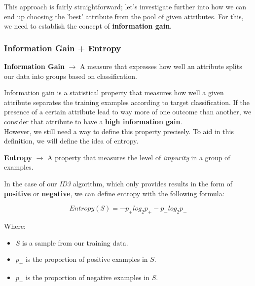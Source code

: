 \documentclass[english, 10pt]{article}
\begin{document}
\hfill \break This approach is fairly straightforward; let's investigate further into how we can end up choosing the 'best' attribute from the pool of given attributes. For this, we need to establish the concept of \textbf{information gain}.

\subsubsection{Information Gain + Entropy}

\hfill \begin{tcolorbox}[title=Definition:,colframe=red!75!black,colback=red!5!white,arc=0pt,fonttitle=\bfseries]
\textbf{Information Gain} $\rightarrow$ A measure that expresses how well an attribute splits our data into groups based on classification.
\end{tcolorbox}

\hfill \break Information gain is a statistical property that measures how well a given attribute separates the training examples according to target classification. If the presence of a certain attribute lead to way more of one outcome than another, we consider that attribute to have a \textbf{high information gain}.\\

However, we still need a way to define this property precisely. To aid in this definition, we will define the idea of entropy.\\

\hfill \begin{tcolorbox}[title=Definition:,colframe=red!75!black,colback=red!5!white,arc=0pt,fonttitle=\bfseries]
\textbf{Entropy} $\rightarrow$ A property that measures the level of \textit{impurity} in a group of examples. 
\end{tcolorbox}

\hfill \break In the case of our \textit{ID3} algorithm, which only provides results in the form of \textbf{positive} or \textbf{negative}, we can define entropy with the following formula:\\

\begin{myproof}

$$ Entropy(S)=-p_+ log_2p_+ -p_-log_2p_- $$

Where:

\begin{itemize}
	\item $S$ is a sample from our training data.
	\item $p_+$ is the proportion of positive examples in $S$.
	\item $p_-$ is the proportion of negative examples in $S$.
\end{itemize}

\end{myproof}
\end{document}
